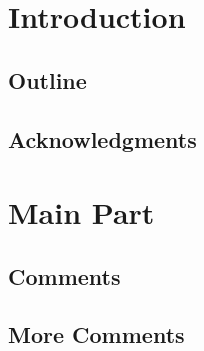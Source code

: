 \documentclass{scrbook}
\begin{document}
\tableofcontents


\chapter{Introduction}
\lipsum[1-10]

\section{Outline}
\lipsum[1-10]

\section{Acknowledgments}
\lipsum[1-10]


\chapter{Main Part}
\lipsum[1-4]

\section{Comments}
\lipsum[1-10]

\begin{pages}
   \begin{Leftside}
      \beginnumbering
         \pstart\lipsum*[1]\pend
         \pstart\lipsum*[2]\pend
         \pstart\lipsum*[4]\pend
         \pstart\lipsum*[8]\pend
         \pstart\lipsum*[10]\pend
         \pstart\lipsum*[2]\pend
         \pstart\lipsum*[3]\pend
         \pstart\lipsum*[5]\pend
         \pstart\lipsum*[7]\pend
         \pstart\lipsum*[6]\pend
      \endnumbering
   \end{Leftside}
   \begin{Rightside}
      \beginnumbering
         \pstart\lipsum*[2]\pend
         \pstart\lipsum*[1]\pend
         \pstart\lipsum*[7]\pend
         \pstart\lipsum*[9]\pend
         \pstart\lipsum*[11]\pend
         \pstart\lipsum*[7]\pend
         \pstart\lipsum*[3]\pend
         \pstart\lipsum*[1]\pend
         \pstart\lipsum*[8]\pend
         \pstart\lipsum*[9]\pend
      \endnumbering
   \end{Rightside}
\end{pages}
\Pages

\section{More Comments}
\lipsum[1-10]
\lipsum[1-10]
\end{document}
